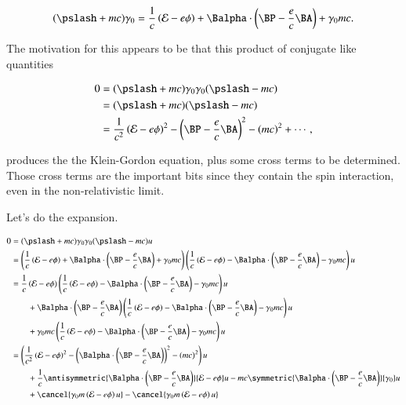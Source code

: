 \begin{equation}\label{eqn:diracGauge:320}
(\pslash + m c) \gamma_0 =
\inv{c} \left( \mathcal{E} - e \phi \right)
+\Balpha \cdot \left(\BP - \frac{e}{c} \BA \right)
+ \gamma_0 m c.
\end{equation}

The motivation for this appears to be that this product of conjugate like quantities

\begin{equation}\label{eqn:diracGauge:340}
\begin{aligned}
0 &= (\pslash + m c) \gamma_0 \gamma_0 (\pslash - m c)  \\
&=
(\pslash + m c) (\pslash - m c) \\
&= \inv{c^2} \left( \mathcal{E} - e \phi \right)^2
 -\left( \BP - \frac{e}{c} \BA \right)^2 - (m c)^2 + \cdots,
\end{aligned}
\end{equation}

produces the the Klein-Gordon equation, plus some cross terms to be determined.  Those cross terms are the important bits since they contain the spin interaction, even in the non-relativistic limit.

Let's do the expansion.

\begin{align*}
0
&= (\pslash + m c) \gamma_0 \gamma_0 (\pslash - m c) u \\
&=
\left(
\inv{c} \left( \mathcal{E} - e \phi \right)
+\Balpha \cdot \left(\BP - \frac{e}{c} \BA \right)
+ \gamma_0 m c
\right)
\left(
\inv{c} \left( \mathcal{E}- e \phi \right)
-\Balpha \cdot \left(\BP - \frac{e}{c} \BA \right)
- \gamma_0 m c \right) u \\
&=
\inv{c} \left( \mathcal{E} - e \phi \right)
\left(
\inv{c} \left( \mathcal{E}- e \phi \right)
-\Balpha \cdot \left(\BP - \frac{e}{c} \BA \right)
- \gamma_0 m c \right) u \\
&\qquad +\Balpha \cdot \left(\BP - \frac{e}{c} \BA \right)
\left(
\inv{c} \left( \mathcal{E}- e \phi \right)
-\Balpha \cdot \left(\BP - \frac{e}{c} \BA \right)
- \gamma_0 m c \right) u \\
&\qquad + \gamma_0 m c
\left(
\inv{c} \left( \mathcal{E}- e \phi \right)
-\Balpha \cdot \left(\BP - \frac{e}{c} \BA \right)
- \gamma_0 m c \right) u \\
&=
\left(
\inv{c^2} \left( \mathcal{E} - e \phi \right)^2
- \left( \Balpha \cdot \left(\BP - \frac{e}{c} \BA \right) \right)^2
- (mc)^2
\right) u
\\
&\qquad + \inv{c} \antisymmetric{
\Balpha \cdot \left(\BP - \frac{e}{c} \BA \right)
}
{
\mathcal{E} - e \phi
} u
- m c
\symmetric{\Balpha \cdot \left(\BP - \frac{e}{c} \BA \right)}{ \gamma_0} u \\
&\qquad + \cancel{\gamma_0 m
\left(
\mathcal{E} - e \phi
\right) u
}
- \cancel{
\gamma_0 m
\left(
\mathcal{E} - e \phi
\right) u
}
\\
\end{align*}

